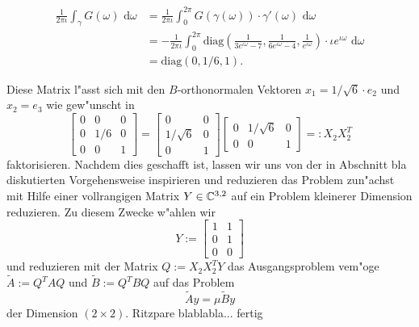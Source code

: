 \begin{align*}
\frac{1}{2\pi\iota} \int_\gamma G(\omega) \text{ d}\omega &=
\frac{1}{2\pi\iota}\int_0^{2\pi} G(\gamma(\omega))\cdot \gamma'(\omega)
\text{ d}\omega \\
&= -\frac{1}{2\pi\iota}\int_0^{2\pi} \text{diag}\left(\frac{1}{3 e^{\iota\omega} - 7}, \frac{1}{6 e^{\iota\omega} - 4},
\frac{1}{e^{\iota\omega}}\right)\cdot \iota e^{\iota\omega} \text{ d}\omega \\
&= \text{diag}(0,1/6, 1).
\end{align*}

Diese Matrix l"asst sich mit den $B$-orthonormalen Vektoren $x_1 = 1/\sqrt6 \cdot e_2$
und $x_2 = e_3$ wie gew"unscht in
\[
\begin{bmatrix} 0 & 0 & 0 \\ 0 & 1/6 & 0 \\ 0 & 0 & 1 \end{bmatrix}
= \begin{bmatrix} 0 & 0  \\ 1/\sqrt6 & 0  \\ 0 & 1  \end{bmatrix}
\begin{bmatrix} 0 & 1/\sqrt6 & 0 \\ 0 & 0 & 1 \end{bmatrix} =: X_2 X_2^T
\]
faktorisieren. Nachdem dies geschafft ist, lassen wir uns von der in Abschnitt
bla diskutierten Vorgehensweise inspirieren und reduzieren das Problem zun"achst mit
Hilfe einer vollrangigen Matrix $Y\in\mathbb{C}^{3,2}$ auf ein Problem kleinerer Dimension
reduzieren. Zu diesem Zwecke w"ahlen wir
\[
Y:=\begin{bmatrix} 1 & 1 \\ 0 & 1 \\ 0 & 0\end{bmatrix}
\]
und reduzieren mit der Matrix $Q:=X_2 X_2^T Y$ das Ausgangsproblem vem"oge
$\widetilde{A}:= Q^T A Q$ und $\widetilde{B}:=Q^T B Q$ auf das Problem
\[
\widetilde{A}y = \mu \widetilde{B}y
\]
der Dimension $(2\times 2)$. Ritzpare blablabla... fertig


